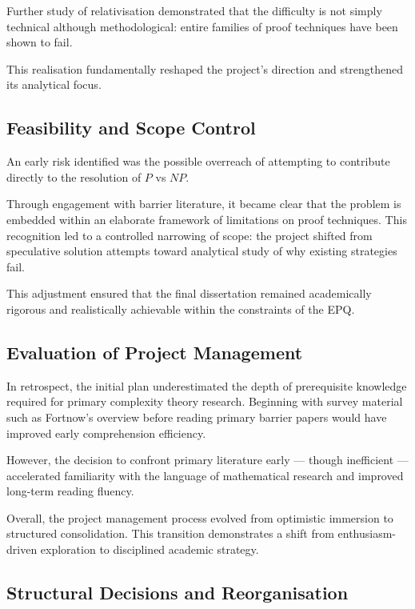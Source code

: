\documentclass[12pt]{article}
\begin{document}
Further study of relativisation demonstrated that the difficulty is not simply technical although methodological: entire families of proof techniques have been shown to fail.

This realisation fundamentally reshaped the project's direction and strengthened its analytical focus.

\subsection{Feasibility and Scope Control}

An early risk identified was the possible overreach of attempting to contribute directly to the resolution of $P$ vs $NP$. 

Through engagement with barrier literature, it became clear that the problem is embedded within an elaborate framework of limitations on proof techniques. This recognition led to a controlled narrowing of scope: the project shifted from speculative solution attempts toward analytical study of why existing strategies fail.

This adjustment ensured that the final dissertation remained academically rigorous and realistically achievable within the constraints of the EPQ.

\subsection{Evaluation of Project Management}

In retrospect, the initial plan underestimated the depth of prerequisite knowledge required for primary complexity theory research. Beginning with survey material such as Fortnow's overview before reading primary barrier papers would have improved early comprehension efficiency.

However, the decision to confront primary literature early --- though inefficient --- accelerated familiarity with the language of mathematical research and improved long-term reading fluency.

Overall, the project management process evolved from optimistic immersion to structured consolidation. This transition demonstrates a shift from enthusiasm-driven exploration to disciplined academic strategy.

\subsection{Structural Decisions and Reorganisation}
\end{document}
